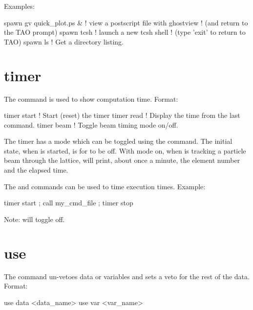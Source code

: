 {{{Examples:
\begin{example}
  spawn gv quick_plot.ps &      ! view a postscript file with ghostview
                                ! (and return to the TAO prompt)
  spawn tcsh                    ! launch a new tcsh shell 
                                ! (type 'exit' to return to TAO)
  spawn ls                      ! Get a directory listing.
\end{example}

\section{timer}
\label{s:timer}

The  command is used to show computation time. Format:
\begin{example}
  timer start      ! Start (reset) the timer
  timer read       ! Display the time from the last  command.    
  timer beam       ! Toggle beam timing mode on/off.
\end{example}
The timer has a  mode which can be toggled using the
 command. The initial state, when \tao is started, is for
 to be off. With  mode on, when \tao
is tracking a particle beam through the lattice, \tao will print,
about once a minute, the element number and the elapsed time.

The  and  commands can
be used to time execution times. Example:
\begin{example}
  timer start ; call my_cmd_file ; timer stop
\end{example}

Note:  will toggle  off.

\section{use}
\label{s:use}

The  command un-vetoes data or variables and sets a veto for
the rest of the data. Format:
\begin{example}
  use data  <data_name>
  use var <var_name>
\end{example}

\vskip 0.2in 

}}}
